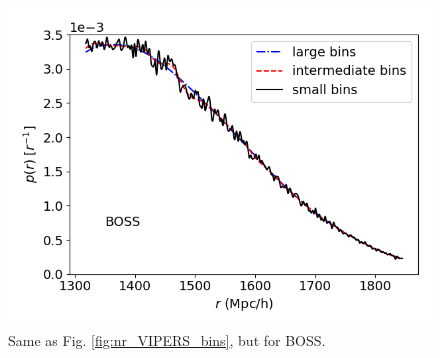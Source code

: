 \documentclass{aa}
\begin{document}
%
%
\begin{figure}
\includegraphics[width=\columnwidth]{Figures/fig_nr_galaxy_DR12v5_CMASS_North_spline_nbins40_nr_galaxy_DR12v5_CMASS_North_spline_nbins100_nr_galaxy_DR12v5_CMASS_North_spline_nbins100} 
    \caption{Same as Fig. \ref{fig:nr_VIPERS_bins}, but for BOSS.}
    \label{fig:nr_BOSS_bins}
\end{figure}
%
\end{document}
